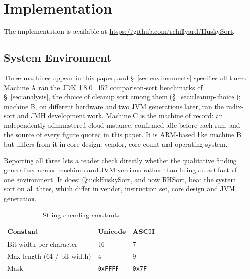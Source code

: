 \documentclass[twoside,leqno,twocolumn]{article}
\begin{document}
\section{Implementation}

The implementation is available at \url{https://github.com/rchillyard/HuskySort}.

\subsection{System Environment}

Three machines appear in this paper, and \S~\ref{sec:environments} specifies all three.
Machine A ran the JDK 1.8.0\_152 comparison-sort benchmarks of \S~\ref{sec:analysis},
the choice of cleanup sort among them (\S~\ref{sec:cleanup-choice});
machine B, on different hardware and two JVM generations later, ran the radix-sort and JMH development work.
Machine C is the machine of record: an independently administered cloud instance, confirmed idle before
each run, and the source of every figure quoted in this paper.
It is ARM-based like machine B but differs from it in core design, vendor, core count and operating system.

Reporting all three lets a reader check directly whether the qualitative finding generalizes across
machines and JVM versions rather than being an artifact of one environment.
It does: QuickHuskySort, and now RHSort, beat the system sort on all three,
which differ in vendor, instruction set, core design and JVM generation.



\begin{table}
  \caption{String-encoding constants}
  \label{tab:EncodingConstants}
  \begin{tabular}{lll}
    \toprule
    Constant & Unicode & ASCII \\
    \midrule
    Bit width per character & 16 & 7 \\
    Max length (64 / bit width) & 4 & 9 \\
    Mask & \texttt{0xFFFF} & \texttt{0x7F} \\
    \bottomrule
  \end{tabular}
\end{table}
\end{document}
